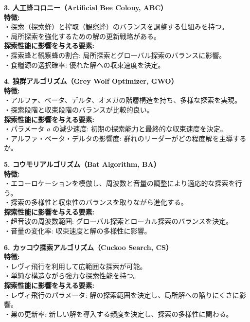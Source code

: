 \documentclass[a4paper]{ltjsarticle}
\begin{document}
\begin{tcolorbox}[arc=6mm, enhanced, borderline={0.5mm}{0mm}{black}, breakable, colback = white]
    \vspace{10pt}
    
    \noindent \textbf{3. 人工蜂コロニー（Artificial Bee Colony, ABC）}\\
    \textbf{特徴:} \\
    ・探索（探索蜂）と搾取（観察蜂）のバランスを調整する仕組みを持つ。\\
    ・局所探索を強化するための解の更新戦略がある。\\
    \textbf{探索性能に影響を与える要素:} \\
    ・探索蜂と観察蜂の割合: 局所探索とグローバル探索のバランスに影響。\\
    ・食糧源の選択確率: 優れた解への収束速度を決定。
    
    \vspace{10pt}
    
    \noindent \textbf{4. 狼群アルゴリズム（Grey Wolf Optimizer, GWO）}\\
    \textbf{特徴:} \\
    ・アルファ、ベータ、デルタ、オメガの階層構造を持ち、多様な探索を実現。\\
    ・探索段階と収束段階のバランスが比較的良い。\\
    \textbf{探索性能に影響を与える要素:} \\
    ・パラメータ $a$ の減少速度: 初期の探索能力と最終的な収束速度を決定。\\
    ・アルファ・ベータ・デルタの影響度: 群れのリーダーがどの程度解を主導するか。
    
    \vspace{10pt}
    
    \noindent \textbf{5. コウモリアルゴリズム（Bat Algorithm, BA）}\\
    \textbf{特徴:} \\
    ・エコーロケーションを模倣し、周波数と音量の調整により適応的な探索を行う。\\
    ・探索の多様性と収束性のバランスを取りながら進化する。\\
    \textbf{探索性能に影響を与える要素:} \\
    ・超音波の周波数範囲: グローバル探索とローカル探索のバランスを決定。\\
    ・音量の変化率: 収束速度と解の多様性に影響。
    
    \vspace{10pt}
    
    \noindent \textbf{6. カッコウ探索アルゴリズム（Cuckoo Search, CS）}\\
    \textbf{特徴:} \\
    ・レヴィ飛行を利用して広範囲な探索が可能。\\
    ・単純な構造ながら強力な探索性能を持つ。\\
    \textbf{探索性能に影響を与える要素:} \\
    ・レヴィ飛行のパラメータ: 解の探索範囲を決定し、局所解への陥りにくさに影響。\\
    ・巣の更新率: 新しい解を導入する頻度を決定し、探索の多様性に関わる。
    
\end{tcolorbox}
\end{document}
